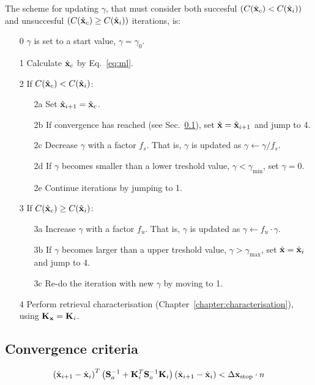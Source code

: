 The scheme for updating $\gamma$, that must consider both succesful
$(C(\hat{\mathbf{x}}_c) < C(\hat{\mathbf{x}}_i))$ and
unsuccesful $(C(\hat{\mathbf{x}}_c) \geq C(\hat{\mathbf{x}}_i))$ iterations, is:
\begin{itemize}
\item[0] $\gamma$ is set to a start value, $\gamma=\gamma_0$.
\item[1] Calculate $\hat{\mathbf{x}}_c$ by Eq.~\ref{eq:ml}.
\item[2] If $C(\hat{\mathbf{x}}_c) < C(\hat{\mathbf{x}}_i)$:
  \begin{itemize}
  \item[2a] Set $\hat{\mathbf{x}}_{i+1}=\hat{\mathbf{x}}_c$.
  \item[2b] If convergence has reached (see Sec.~\ref{sec:conv}), set
    $\hat{\mathbf{x}}=\hat{\mathbf{x}}_{i+1}$ and jump to 4.
  \item[2c] Decrease $\gamma$ with a factor $f_s$. That is, $\gamma$ is updated
    as $\gamma\leftarrow\gamma/f_s$. 
  \item[2d] If $\gamma$ becomes smaller than a lower
    treshold value, $\gamma<\gamma_\mathrm{min}$, set $\gamma=0$.
  \item[2e] Continue iterations by jumping to 1.
  \end{itemize}
\item[3] If $C(\hat{\mathbf{x}}_c) \geq C(\hat{\mathbf{x}}_i)$:
  \begin{itemize}
  \item[3a] Increase $\gamma$ with a factor $f_u$. That is, $\gamma$ is updated
    as $\gamma\leftarrow f_u\cdot\gamma$.
  \item[3b] If $\gamma$ becomes larger than a upper treshold value,
    $\gamma>\gamma_\mathrm{max}$, set $\hat{\mathbf{x}}=\hat{\mathbf{x}}_i$ and jump to 4.
  \item[3c] Re-do the iteration with new $\gamma$ by moving to 1.
  \end{itemize}
\item[4] Perform retrieval characterisation
  (Chapter~\ref{chapter:characterisation}), using $\mathbf{K}_{\mathbf{x}}=\mathbf{K}_{i}$.
\end{itemize}



\subsection{Convergence criteria}
\label{sec:conv}
%

\begin{equation}
  \label{eq:stopcrit}
  \left( \hat{\mathbf{x}}_{i+1} - \hat{\mathbf{x}}_i \right)^T
  \left( \mathbf{S}_{a}^{-1} + 
         \mathbf{K}_{i}^T\mathbf{S}_{o}^{-1}\mathbf{K}_{i} \right)
  \left( \hat{\mathbf{x}}_{i+1} - \hat{\mathbf{x}}_i \right) < \Delta\mathbf{x}_\mathrm{stop} \cdot n
\end{equation}



